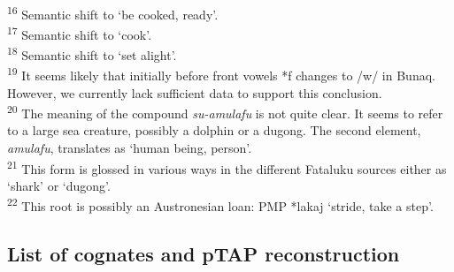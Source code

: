 \documentclass[output=paper]{LSP/langsci}
\begin{document}
\\
\textsuperscript{16} Semantic shift to `be cooked, ready'. 
\\
\textsuperscript{17} Semantic shift to `cook'. 
\\
\textsuperscript{18} Semantic shift to `set alight'.
\\
\textsuperscript{19} It seems likely that initially before front vowels *f changes to /w/ in Bunaq. However, we currently lack sufficient data to support this conclusion. 
\\
\textsuperscript{20} The meaning of the compound \textit{su-amulafu} is not quite clear. It seems to refer to a large sea creature, possibly a dolphin or a dugong. The second element, \textit{amulafu}, translates as `human being, person'. 
\\
\textsuperscript{21} This form is glossed in various ways in the different Fataluku sources either as `shark' or `dugong'.
\\
\textsuperscript{22} This root is possibly an Austronesian loan: PMP *lakaj `stride, take a step'.

 
\clearpage
\subsection{List of cognates and pTAP reconstruction}
 
\end{document}
